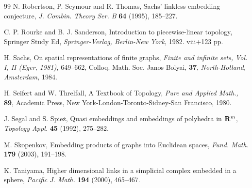 \documentclass{amsart}
\theoremstyle{definition}
\theoremstyle{remark}
\numberwithin{equation}{section}
\begin{document}
{\begin{thebibliography}{99}
N. Robertson, P. Seymour and R. Thomas, 
Sachs' linkless embedding conjecture,  
\textit{J. Combin. Theory Ser. B} {\bf 64} (1995), 185--227. 






C. P. Rourke and B. J. Sanderson, 
Introduction to piecewise-linear topology, 
Springer Study Ed, \textit{Springer-Verlag, Berlin-New York,} 1982. viii+123 pp. 



H. Sachs, 
On spatial representations of finite graphs, 
\textit{Finite and infinite sets, Vol. I, II (Eger, 1981),} 649--662, 
Colloq. Math. Soc. Janos Bolyai, {\bf 37}, \textit{North-Holland, Amsterdam,} 1984.

H. Seifert and W. Threlfall, 
A Textbook of Topology, \textit{Pure and Applied Math.,} {\bf 89}, 
Academic Press, New York-London-Toronto-Sidney-San Francisco, 1980. 


J. Segal and S. Spie\.{z}, 
Quasi embeddings and embeddings of polyhedra in ${\bf R}^{m}$, 
\textit{Topology Appl.} {\bf 45} (1992), 275--282.


M. Skopenkov, 
Embedding products of graphs into Euclidean spaces, \textit{Fund. Math.} {\bf 179} (2003), 191--198. 


K. Taniyama, 
Higher dimensional links in a simplicial complex embedded in a sphere, 
\textit{Pacific J. Math.} {\bf 194} (2000), 465--467. 






\end{thebibliography}
% 
}
\end{document}
